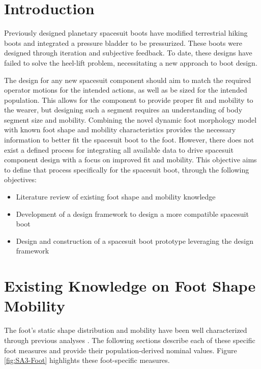 \documentclass[defaultstyle,11pt]{comps}
\providecommand{\tightlist}{%
  \setlength{\itemsep}{0pt}\setlength{\parskip}{0pt}}
\begin{document}
\hypertarget{introduction-2}{%
\section{Introduction}\label{introduction-2}}

Previously designed planetary spacesuit boots have modified terrestrial hiking boots and integrated a pressure bladder to be pressurized.
These boots were designed through iteration and subjective feedback.
To date, these designs have failed to solve the heel-lift problem, necessitating a new approach to boot design.

The design for any new spacesuit component should aim to match the required operator motions for the intended actions, as well as be sized for the intended population.
This allows for the component to provide proper fit and mobility to the wearer, but designing such a segment requires an understanding of body segment size and mobility.
Combining the novel dynamic foot morphology model with known foot shape and mobility characteristics provides the necessary information to better fit the spacesuit boot to the foot.
However, there does not exist a defined process for integrating all available data to drive spacesuit component design with a focus on improved fit and mobility.
This objective aims to define that process specifically for the spacesuit boot, through the following objectives:

\begin{itemize}
\tightlist
\item
  Literature review of existing foot shape and mobility knowledge
\item
  Development of a design framework to design a more compatible spacesuit boot
\item
  Design and construction of a spacesuit boot prototype leveraging the design framework
\end{itemize}

\hypertarget{existing-knowledge-on-foot-shape-mobility}{%
\section{Existing Knowledge on Foot Shape Mobility}\label{existing-knowledge-on-foot-shape-mobility}}

The foot's static shape distribution and mobility have been well characterized through previous analyses \citep{Farris2019, Mann1979, Voloshina2013, Wannop2014}.
The following sections describe each of these specific foot measures and provide their population-derived nominal values.
Figure \ref{fig:SA3-Foot} highlights these foot-specific measures.
\end{document}
